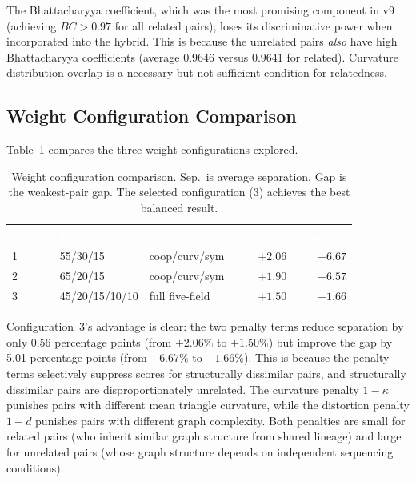\documentclass{../yalumba}
\begin{document}
\begin{keyfinding}
The Bhattacharyya coefficient, which was the most promising component in
v9 (achieving $BC > 0.97$ for all related pairs), loses its
discriminative power when incorporated into the hybrid.  This is because
the unrelated pairs \emph{also} have high Bhattacharyya coefficients
(average 0.9646 versus 0.9641 for related).  Curvature distribution
overlap is a necessary but not sufficient condition for relatedness.
\end{keyfinding}

\subsection{Weight Configuration Comparison}

Table~\ref{tab:weights} compares the three weight configurations
explored.

\begin{table}[htbp]
\centering
\tablestyle
\caption{Weight configuration comparison.  Sep.\ is average separation.
Gap is the weakest-pair gap.  The selected configuration (3) achieves the
best balanced result.}
\label{tab:weights}
\begin{tabular}{@{}lllrr@{}}
\toprule
\rowcolor{table-header}
\textcolor{white}{\textbf{Config}} &
\textcolor{white}{\textbf{Weights}} &
\textcolor{white}{\textbf{Components}} &
\textcolor{white}{\textbf{Sep.\ (\%)}} &
\textcolor{white}{\textbf{Gap (\%)}} \\
\midrule
1 & 55/30/15       & coop/curv/sym   & $+2.06$ & $-6.67$ \\
2 & 65/20/15       & coop/curv/sym   & $+1.90$ & $-6.57$ \\
\rowcolor{yalumba-cream}
3 & 45/20/15/10/10 & full five-field & $+1.50$ & $-1.66$ \\
\bottomrule
\end{tabular}
\end{table}

Configuration~3's advantage is clear: the two penalty terms reduce
separation by only 0.56 percentage points (from $+2.06\%$ to $+1.50\%$)
but improve the gap by 5.01 percentage points (from $-6.67\%$ to
$-1.66\%$).  This is because the penalty terms selectively suppress
scores for structurally dissimilar pairs, and structurally dissimilar
pairs are disproportionately unrelated.  The curvature penalty $1-\kappa$
punishes pairs with different mean triangle curvature, while the
distortion penalty $1-d$ punishes pairs with different graph complexity.
Both penalties are small for related pairs (who inherit similar graph
structure from shared lineage) and large for unrelated pairs (whose graph
structure depends on independent sequencing conditions).
\end{document}
